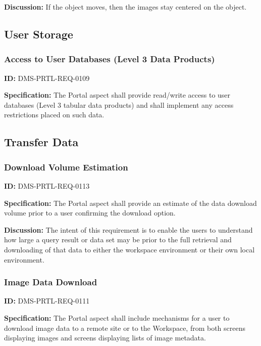 \documentclass[SE,toc,lsstdraft]{lsstdoc}
\begin{document}
\textbf{Discussion:}
If the object moves, then the images stay centered on the object.

\subsection{User Storage}

\subsubsection{Access to User Databases (Level 3 Data Products)}

\label{DMS-PRTL-REQ-0109}
\textbf{ID:} DMS-PRTL-REQ-0109

\textbf{Specification:}
The Portal aspect shall provide read/write access to user databases (Level 3 tabular data products) and shall implement any access restrictions placed on such data.

\subsection{Transfer Data}

\subsubsection{Download Volume Estimation}

\label{DMS-PRTL-REQ-0113}
\textbf{ID:} DMS-PRTL-REQ-0113

\textbf{Specification:}
The Portal aspect shall provide an estimate of the data download volume prior to a user confirming the download option.

\textbf{Discussion:}
The intent of this requirement is to enable the users to understand how large a query result or data set may be prior to the full retrieval and downloading of that data to either the workspace environment or their own local environment.

\subsubsection{Image Data Download}

\label{DMS-PRTL-REQ-0111}
\textbf{ID:} DMS-PRTL-REQ-0111

\textbf{Specification:}
The Portal aspect shall include mechanisms for a user to download image data to a remote site or to the Workspace, from both screens displaying images and screens displaying lists of image metadata.
\end{document}
